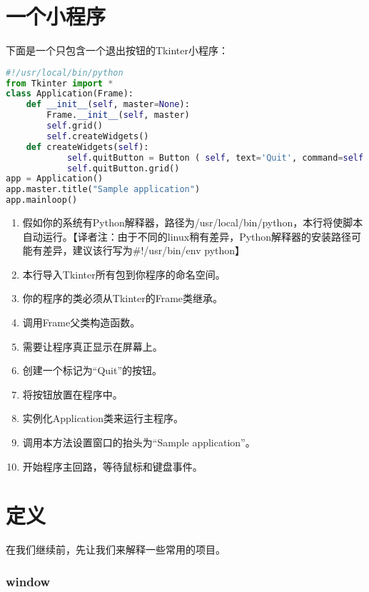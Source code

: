 \documentclass[11pt,a4paper,oneside]{book}
\begin{document}
\chapter[一个小程序]{一个小程序}%
下面是一个只包含一个退出按钮的Tkinter小程序：
\begin{lstlisting}[language=python]
#!/usr/local/bin/python                      
from Tkinter import * 			     
class Application(Frame): 			
	def __init__(self, master=None):     
		Frame.__init__(self, master) 
		self.grid() 		     	
		self.createWidgets() 
	def createWidgets(self): 
			self.quitButton = Button ( self, text='Quit', command=self.quit ) 	
			self.quitButton.grid()  
app = Application() 						
app.master.title("Sample application") 	
app.mainloop()                         
\end{lstlisting}
\begin{enumerate}
\item 假如你的系统有Python解释器，路径为/usr/local/bin/python，本行将使脚本自动运行。【译者注：由于不同的linux稍有差异，Python解释器的安装路径可能有差异，建议该行写为\#!/usr/bin/env python】
\item 本行导入Tkinter所有包到你程序的命名空间。
\item 你的程序的类必须从Tkinter的Frame类继承。
\item 调用Frame父类构造函数。
\item 需要让程序真正显示在屏幕上。
\item 创建一个标记为“Quit”的按钮。
\item 将按钮放置在程序中。
\item 实例化Application类来运行主程序。
\item 调用本方法设置窗口的抬头为“Sample application”。
\item 开始程序主回路，等待鼠标和键盘事件。
\end{enumerate}
\chapter[定义]{定义}%
在我们继续前，先让我们来解释一些常用的项目。
\subsection*{\textbf{window}}
\end{document}
